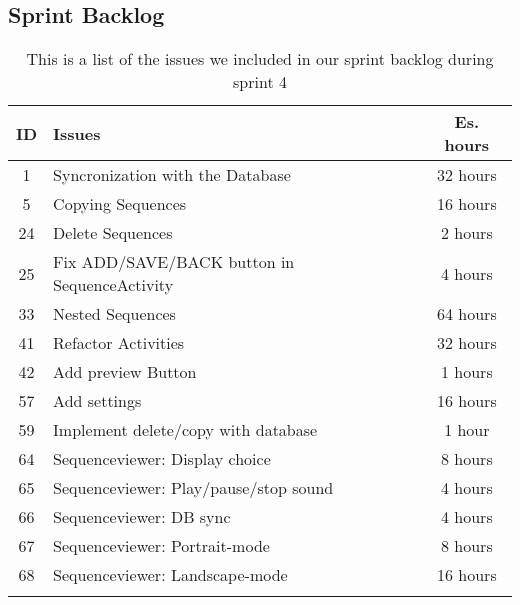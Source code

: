 \subsection{Sprint Backlog}\label{subsec:spr4_sprblog}
\begin{longtable} { | c | p{12cm} | c | } 
\hline
	ID 	&	Issues	&	Es. hours  \\\hline
	1	& 	Syncronization with the Database		&	32 hours  \\\hline
	5	& 	Copying Sequences		&	16 hours  \\\hline
	24	& 	Delete Sequences		&	2 hours  \\\hline
	25	& 	Fix ADD/SAVE/BACK button in SequenceActivity		&	4 hours  \\\hline
	33	& 	Nested Sequences		&	64 hours  \\\hline
	41	& 	Refactor Activities		&	32 hours  \\\hline
	42	&	Add preview Button		&	1 hours	  \\\hline
	57  &	Add settings			&	16 hours	\\\hline	
	59  &	Implement delete/copy with database	&	1 hour \\\hline
	64	& 	Sequenceviewer: Display choice		&	8 hours  \\\hline
	65	& 	Sequenceviewer: Play/pause/stop sound		&	4 hours  \\\hline
	66	& 	Sequenceviewer: DB sync		&	4 hours  \\\hline
	67	& 	Sequenceviewer: Portrait-mode		&	8 hours  \\\hline
	68	& 	Sequenceviewer: Landscape-mode	&	16 hours  \\\hline
\caption{This is a list of the issues we included in our sprint backlog during sprint 4}
\label{tab:spr4_sprintblog}
\end{longtable}